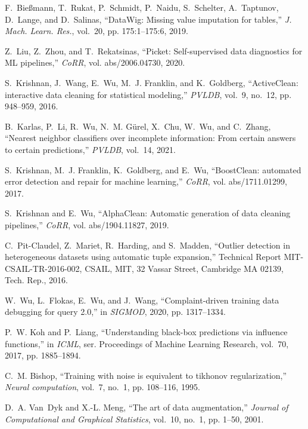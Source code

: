 \documentclass[11pt,dvipsnames]{article}
\begin{document}
\begin{thebibliography}{10}
F.~Bie{\ss}mann, T.~Rukat, P.~Schmidt, P.~Naidu, S.~Schelter, A.~Taptunov,
  D.~Lange, and D.~Salinas, ``Data{W}ig: Missing value imputation for tables,''
  \emph{J. Mach. Learn. Res.}, vol.~20, pp. 175:1--175:6, 2019.

Z.~Liu, Z.~Zhou, and T.~Rekatsinas, ``Picket: Self-supervised data diagnostics
  for {ML} pipelines,'' \emph{CoRR}, vol. abs/2006.04730, 2020.

S.~Krishnan, J.~Wang, E.~Wu, M.~J. Franklin, and K.~Goldberg, ``{ActiveClean:}
  interactive data cleaning for statistical modeling,'' \emph{PVLDB}, vol.~9,
  no.~12, pp. 948--959, 2016.

B.~Karlas, P.~Li, R.~Wu, N.~M. G{\"{u}}rel, X.~Chu, W.~Wu, and C.~Zhang,
  ``Nearest neighbor classifiers over incomplete information: From certain
  answers to certain predictions,'' \emph{PVLDB}, vol.~14, 2021.

S.~Krishnan, M.~J. Franklin, K.~Goldberg, and E.~Wu, ``{BoostClean:} automated
  error detection and repair for machine learning,'' \emph{CoRR}, vol.
  abs/1711.01299, 2017.

S.~Krishnan and E.~Wu, ``Alpha{C}lean: Automatic generation of data cleaning
  pipelines,'' \emph{CoRR}, vol. abs/1904.11827, 2019.

C.~Pit-Claudel, Z.~Mariet, R.~Harding, and S.~Madden, ``Outlier detection in
  heterogeneous datasets using automatic tuple expansion,'' Technical Report
  MIT-CSAIL-TR-2016-002, CSAIL, MIT, 32 Vassar Street, Cambridge MA 02139,
  Tech. Rep., 2016.

W.~Wu, L.~Flokas, E.~Wu, and J.~Wang, ``Complaint-driven training data
  debugging for query 2.0,'' in \emph{SIGMOD}, 2020, pp. 1317--1334.

P.~W. Koh and P.~Liang, ``Understanding black-box predictions via influence
  functions,'' in \emph{ICML}, ser. Proceedings of Machine Learning Research,
  vol.~70, 2017, pp. 1885--1894.

C.~M. Bishop, ``Training with noise is equivalent to tikhonov regularization,''
  \emph{Neural computation}, vol.~7, no.~1, pp. 108--116, 1995.

D.~A. Van~Dyk and X.-L. Meng, ``The art of data augmentation,'' \emph{Journal
  of Computational and Graphical Statistics}, vol.~10, no.~1, pp. 1--50, 2001.


\end{thebibliography}
\end{document}
